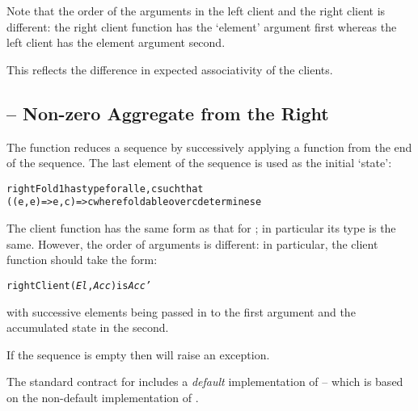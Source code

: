 \begin{aside}
Note that the order of the arguments in the left client and the right client is different: the right client function has the `element' argument first whereas the left client has the element argument second.

This reflects the difference in expected associativity of the clients.
\end{aside}

\subsection{ -- Non-zero Aggregate from the Right}
\label{rightFold1}
The  function reduces a sequence by successively applying a function from the end of the sequence. The last element of the sequence is used as the initial `state':
\begin{alltt}
rightFold1 has type for all e,c such that
    ((e,e)=>e,c) => c where foldable over c determines e
\end{alltt}

\begin{aside}
The client function has the same form as that for ; in particular its type is the same. However, the order of arguments is different: in particular, the client function should take the form:
\begin{alltt}
rightClient(\emph{El},\emph{Acc}) is \emph{Acc'}
\end{alltt}
with successive elements being passed in to the first argument and the accumulated state in the second.
\end{aside}

\begin{aside}
If the sequence is empty then  will raise an exception.
\end{aside}

\begin{aside}
The standard contract for  includes a \emph{default} implementation of  -- which is based on the non-default implementation of .
\end{aside}

